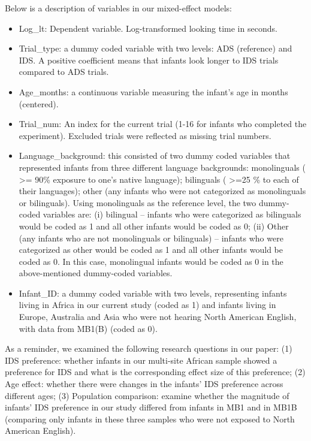 \documentclass[
  ,man,floatsintext]{apa6}
\providecommand{\tightlist}{%
  \setlength{\itemsep}{0pt}\setlength{\parskip}{0pt}}
\begin{document}
Below is a description of variables in our mixed-effect models:

\begin{itemize}
\tightlist
\item
  Log\_lt: Dependent variable. Log-transformed looking time in seconds.
\item
  Trial\_type: a dummy coded variable with two levels: ADS (reference) and IDS. A positive coefficient means that infants look longer to IDS trials compared to ADS trials.
\item
  Age\_months: a continuous variable measuring the infant's age in months (centered).
\item
  Trial\_num: An index for the current trial (1-16 for infants who completed the experiment). Excluded trials were reflected as missing trial numbers.
\item
  Language\_background: this consisted of two dummy coded variables that represented infants from three different language backgrounds: monolinguals ( \textgreater= 90\% exposure to one's native language); bilinguals ( \textgreater=25 \% to each of their languages); other (any infants who were not categorized as monolinguals or bilinguals). Using monolinguals as the reference level, the two dummy-coded variables are: (i) bilingual -- infants who were categorized as bilinguals would be coded as 1 and all other infants would be coded as 0; (ii) Other (any infants who are not monolinguals or bilinguals) -- infants who were categorized as other would be coded as 1 and all other infants would be coded as 0. In this case, monolingual infants would be coded as 0 in the above-mentioned dummy-coded variables.
\item
  Infant\_ID: a dummy coded variable with two levels, representing infants living in Africa in our current study (coded as 1) and infants living in Europe, Australia and Asia who were not hearing North American English, with data from MB1(B) (coded as 0).
\end{itemize}

As a reminder, we examined the following research questions in our paper: (1) IDS preference: whether infants in our multi-site African sample showed a preference for IDS and what is the corresponding effect size of this preference; (2) Age effect: whether there were changes in the infants' IDS preference across different ages; (3) Population comparison: examine whether the magnitude of infants' IDS preference in our study differed from infants in MB1 and in MB1B (comparing only infants in these three samples who were not exposed to North American English).
\end{document}
